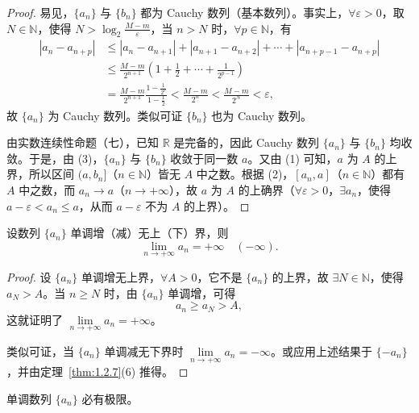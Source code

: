 \begin{proof}
易见，$\{a_n\}$ 与 $\{b_n\}$ 都为 Cauchy 数列（基本数列）。事实上，$\forall \varepsilon > 0$，取 $N \in \mathbb{N}$，使得 $N > \log_2 \frac{M-m}{\varepsilon}$，当 $n > N$ 时，$\forall p \in \mathbb{N}$，有
\begin{align*}
|a_n - a_{n+p}| &\leqslant |a_n - a_{n+1}| + |a_{n+1} - a_{n+2}| + \cdots + |a_{n+p-1} - a_{n+p}| \\
&\leqslant \frac{M-m}{2^{n+1}}\left(1 + \frac{1}{2} + \cdots + \frac{1}{2^{p-1}}\right) \\
&= \frac{M-m}{2^{n+1}}\frac{1-\frac{1}{2^p}}{1-\frac{1}{2}} < \frac{M-m}{2^n} < \frac{M-m}{2^N} < \varepsilon,
\end{align*}
故 $\{a_n\}$ 为 Cauchy 数列。类似可证 $\{b_n\}$ 也为 Cauchy 数列。

由实数连续性命题（七），已知 $\mathbb{R}$ 是完备的，因此 Cauchy 数列 $\{a_n\}$ 与 $\{b_n\}$ 均收敛。于是，由 (3)，$\{a_n\}$ 与 $\{b_n\}$ 收敛于同一数 $a$。又由 (1) 可知，$a$ 为 $A$ 的上界，所以区间 $(a, b_n]$（$n \in \mathbb{N}$）皆无 $A$ 中之数。根据 (2)，$[a_n, a]$（$n \in \mathbb{N}$）都有 $A$ 中之数，而 $a_n \to a$（$n \to +\infty$），故 $a$ 为 $A$ 的上确界（$\forall \varepsilon > 0$，$\exists a_n$，使得 $a - \varepsilon < a_n \leqslant a$，从而 $a - \varepsilon$ 不为 $A$ 的上界）。
\end{proof}

\begin{theorem}\label{thm:1.3.2}
设数列 $\{a_n\}$ 单调增（减）无上（下）界，则
\[
\lim_{n\to+\infty} a_n = +\infty\quad (-\infty).
\]
\end{theorem}

\begin{proof}
设 $\{a_n\}$ 单调增无上界，$\forall A > 0$，它不是 $\{a_n\}$ 的上界，故 $\exists N \in \mathbb{N}$，使得 $a_N > A$。当 $n \geqslant N$ 时，由 $\{a_n\}$ 单调增，可得
\[
a_n \geqslant a_N > A,
\]
这就证明了 $\lim\limits_{n\to+\infty} a_n = +\infty$。

类似可证，当 $\{a_n\}$ 单调减无下界时 $\lim\limits_{n\to+\infty} a_n = -\infty$。或应用上述结果于 $\{-a_n\}$，并由定理~\ref{thm:1.2.7}(6) 推得。
\end{proof}

\begin{corollary}\label{cor:1.3.1}
单调数列 $\{a_n\}$ 必有极限。
\end{corollary}

